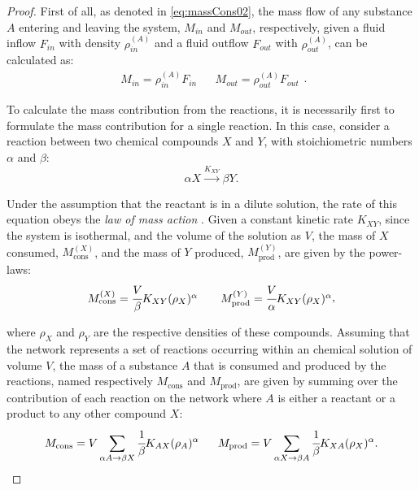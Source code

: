 \documentclass[a4paper,11pt]{book}
\numberwithin{figure}{chapter}
\numberwithin{equation}{chapter}
\numberwithin{table}{chapter}
\theoremstyle{definition}
\begin{document}
\begin{proof}
    First of all, as denoted in \eqref{eq:massCons02}, the mass flow of any substance $A$ entering and leaving the system, $M_{in}$ and $M_{out}$, respectively, given a fluid inflow $F_{in}$ with density $\rho^{(A)}_{in}$ and a fluid outflow $F_{out}$ with $\rho^{(A)}_{out}$, can be calculated as:
    \begin{equation}
        \begin{matrix}
            M_{in} = \rho^{(A)}_{in} F_{in} & & M_{out} = \rho^{(A)}_{out} F_{out}
        \end{matrix}
    .\end{equation}
    
    To calculate the mass contribution from the reactions, it is necessarily first to formulate the mass contribution for a single reaction. In this case, consider a reaction between two chemical compounds $X$ and $Y$, with stoichiometric numbers $\alpha$ and $\beta$:
    \begin{equation} \label{eq:simpleEq01}
        \alpha X \overset{K_{XY}}{\longrightarrow} \beta Y
    .\end{equation}
    
    Under the assumption that the reactant is in a dilute solution, the rate of this equation obeys the \textit{law of mass action} \cite{Horn:1972}. Given a constant kinetic rate $K_{XY}$, since the system is isothermal, and the volume of the solution as $V$, the mass of $X$ consumed, $M^{(X)}_\text{cons}$, and the mass of $Y$ produced, $M^{(Y)}_\text{prod}$, are given by the power-laws:
    \begin{equation}
        \begin{matrix}
            M^{(X)}_\text{cons} = \cfrac{V}{\beta} K_{XY} (\rho_X)^{\alpha} & & M^{(Y)}_\text{prod} = \cfrac{V}{\alpha} K_{XY} (\rho_X)^{\alpha}
        \end{matrix}
    ,\end{equation}
    
    \noindent where $\rho_X$ and $\rho_Y$ are the respective densities of these compounds. Assuming that the network represents a set of reactions occurring within an chemical solution of volume $V$, the mass of a substance $A$ that is consumed and produced by the reactions, named respectively $M_\text{cons}$ and $M_\text{prod}$, are given by summing over the contribution of each reaction on the network where $A$ is either a reactant or a product to any other compound $X$:
    \begin{equation}
            M_\text{cons} = V \sum_{\alpha A \rightarrow \beta X} \cfrac{1}{\beta} K_{AX} (\rho_A)^{\alpha}\ \ \ \ \  M_\text{prod} = V \sum_{\alpha X \rightarrow \beta A} \cfrac{1}{\beta} K_{XA} (\rho_X)^{\alpha}
    .\end{equation}
    

\end{proof}
\end{document}
